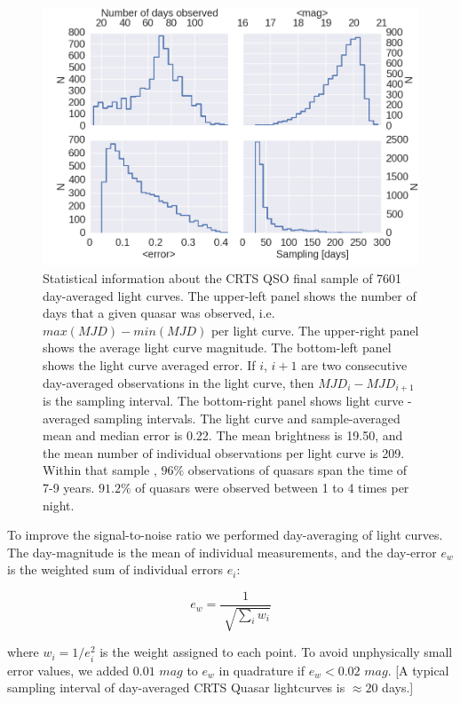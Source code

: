 \documentclass[fleqn,usenatbib]{mnras}  %
\begin{document}
\begin{figure}
\label{fig:CRTS_QSO_stats}
 \includegraphics[width=\columnwidth]{Fig_1_Stats_CRTS_QSO_used.png}
 \caption{Statistical information about the CRTS QSO final sample of 7601 day-averaged light curves. The upper-left panel shows the number of days that a given quasar was observed, i.e. $max(MJD)-min(MJD)$ per light curve. The upper-right panel shows the average light curve magnitude. The bottom-left panel shows the light curve averaged error. If $i$, $i+1$ are two consecutive day-averaged observations in the light curve, then $MJD_{i} - MJD_{i+1}$ is the sampling interval. The bottom-right panel shows light curve - averaged sampling intervals. The light curve and sample-averaged mean and median error is 0.22. The mean  brightness is 19.50, and the mean number of individual observations per light curve  is 209. Within that sample , $96 \% $ observations of quasars span the time of 7-9 years.  $91.2\%$ of  quasars were observed between 1 to 4 times per night.}
\end{figure}


To improve the signal-to-noise ratio we performed day-averaging of light curves. The day-magnitude is the mean of individual measurements, and the day-error $e_{w}$ is the weighted sum of individual errors $e_{i}$: 

\begin{equation}
 e_{w} = \frac{1}{\sqrt[]{\sum_{i} w_{i}}}
\end{equation}

where $ w_{i} = 1 / e_{i}^{2}$ is the weight assigned to each point. To avoid unphysically small error values, we added  $0.01$ $mag$ to $e_{w}$ in quadrature if $e_{w}<0.02$ $mag$. [A typical sampling interval of day-averaged CRTS Quasar lightcurves is $\approx 20$ days.] 
\end{document}
